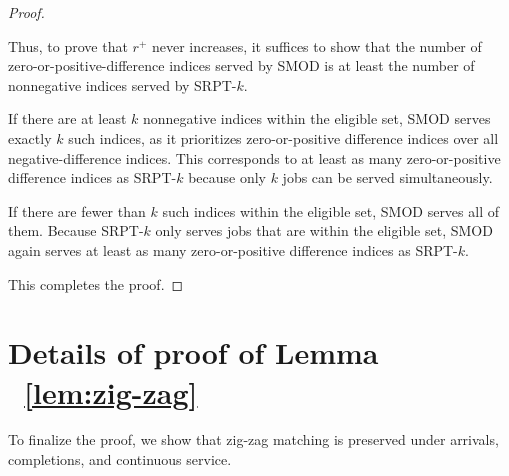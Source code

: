\documentclass[acmsmall]{acmart}
\begin{document}
\begin{proof}
\begin{itemize}
        Thus, to prove that $r^+$ never increases, it suffices to show that the number of zero-or-positive-difference indices served by SMOD is at least the number of nonnegative indices served by SRPT-$k$.
        
        If there are at least $k$ nonnegative indices within the eligible set, SMOD serves exactly $k$ such indices, as it prioritizes zero-or-positive difference indices over all negative-difference indices.
        This corresponds to at least as many zero-or-positive difference indices as SRPT-$k$ because only $k$ jobs can be served simultaneously.
        
        If there are fewer than $k$ such indices within the eligible set, SMOD serves all of them. Because SRPT-$k$ only serves jobs that are within the eligible set, SMOD again serves at least as many zero-or-positive difference indices as SRPT-$k$.
    \end{itemize}

    This completes the proof.
\end{proof}


\section[Details of Proof of Lemma ~\ref{lem:zig-zag}]{Details of proof of Lemma ~\ref{lem:zig-zag}}
\label{ap:zig-zag-proof}

To finalize the proof, we show that zig-zag matching is preserved under arrivals, completions, and continuous service.
\end{document}
